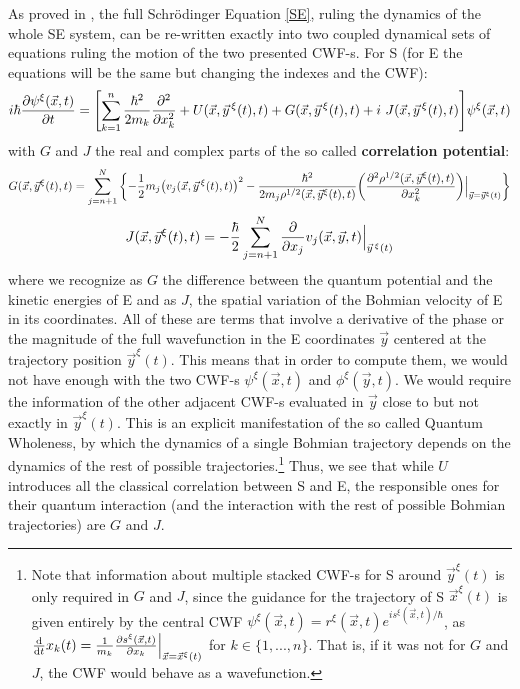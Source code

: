 \documentclass[11pt, a4paper]{article} %
\begin{document}
As proved in \cite{GJ}, the full Schrödinger Equation \eqref{SE}, ruling the dynamics of the whole SE system, can be re-written exactly into two coupled dynamical sets of equations ruling the motion of the two presented CWF-s. For S (for E the equations will be the same but changing the indexes and the CWF):
\begin{equation}\label{SE.GJ}
i \hbar \pdv{\psi^\xi (\vec{x},t)}{t} = \qty[\sum_{k=1}^n\frac{\hbar^2}{2m_k} \pdv[2]{}{x_k} +  U(\vec{x}, \vec{y}^{\, \xi}(t),t) + G(\vec{x}, \vec{y}^{\, \xi}(t),t)+i\ J(\vec{x}, \vec{y}^{\, \xi}(t),t)] \psi^\xi (\vec{x},t)
\end{equation}
with $G$ and $J$ the real and complex parts of the so called {\bf correlation potential}:
\begin{equation}\label{G.Bohm}
G(\vec{x},\vec{y}^\xi(t),t)=\sum_{j=n+1}^N\qty{-\frac{1}{2}m_j\qty(v_j(\vec{x},\vec{y}^{\, \xi}(t),t))^2-\frac{\hbar^2}{2m_j\rho^{1/2}(\vec{x},\vec{y}^\xi(t),t)}\qty(\pdv[2]{\rho^{1/2}(\vec{x},\vec{y}^\xi(t),t)}{x_k})\Big\rvert_{\vec{y}=\vec{y}^\xi(t)} }
\end{equation}
\begin{equation}\label{J.Bohm}
J(\vec{x},\vec{y}^\xi(t),t)=-\frac{\hbar}{2}\sum_{j=n+1}^N\pdv{}{x_j}v_j(\vec{x},\vec{y},t)\Big\rvert_{\vec{y}^{\, \xi}(t)}
\end{equation}
where we recognize as $G$ the difference between the quantum potential and the kinetic energies of E and as $J$, the spatial variation of the Bohmian velocity of E in its coordinates. All of these are terms that involve a derivative of the phase or the magnitude of the full wavefunction in the E coordinates $\vec{y}$ centered at the trajectory position $\vec{y}^\xi(t)$. This means that in order to compute them, we would not have enough with the two CWF-s $\psi^\xi(\vec{x},t)$ and $\phi^\xi(\vec{y},t)$. We would require the information of the other adjacent CWF-s evaluated in $\vec{y}$ close to but not exactly in $\vec{y}^\xi(t)$. This is an explicit manifestation of the so called Quantum Wholeness, by which the dynamics of a single Bohmian trajectory depends on the dynamics of the rest of possible trajectories.\footnote{Note that information about multiple stacked CWF-s for S around $\vec{y}^\xi(t)$ is only required in $G$ and $J$, since the guidance for the trajectory of S $\vec{x}^\xi(t)$ is given entirely by the central CWF $\psi^\xi (\vec{x},t)=r^\xi(\vec{x},t)e^{is^\xi(\vec{x},t)/\hbar}$, as $\dv{}{t}x_k(t)=\frac{1}{m_k}\pdv{s^\xi(\vec{x},t)}{x_k}\Big\rvert_{\vec{x}=\vec{x}^\xi(t)}$ for $k\in\{1,...,n\}$. That is, if it was not for $G$ and $J$, the CWF would behave as a wavefunction.} Thus, we see that while $U$ introduces all the classical correlation between S and E, the responsible ones for their quantum interaction (and the interaction with the rest of possible Bohmian trajectories) are $G$ and $J$.
\end{document}
